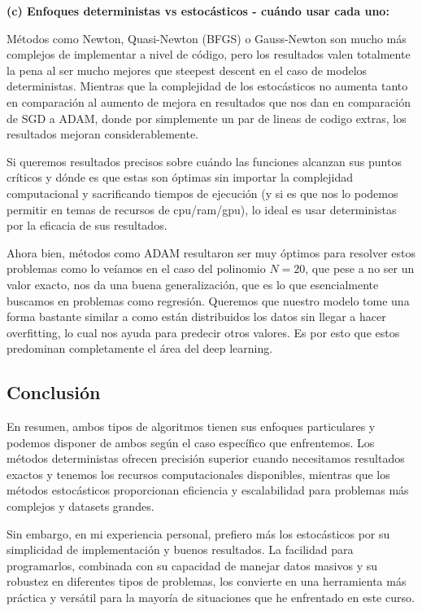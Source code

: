 \documentclass{article}
\begin{document}
\textbf{(c) Enfoques deterministas vs estocásticos - cuándo usar cada uno:}

Métodos como Newton, Quasi-Newton (BFGS) o Gauss-Newton son mucho más complejos de implementar a nivel de código, pero los resultados valen totalmente la pena al ser mucho mejores que steepest descent en el caso de modelos deterministas. Mientras que la complejidad de los estocásticos no aumenta tanto en comparación al aumento de mejora en resultados que nos dan en comparación de SGD a ADAM, donde por simplemente un par de lineas de codigo extras, los resultados mejoran considerablemente.

Si queremos resultados precisos sobre cuándo las funciones alcanzan sus puntos críticos y dónde es que estas son óptimas sin importar la complejidad computacional y sacrificando tiempos de ejecución (y si es que nos lo podemos permitir en temas de recursos de cpu/ram/gpu), lo ideal es usar deterministas por la eficacia de sus resultados.

Ahora bien, métodos como ADAM resultaron ser muy óptimos para resolver estos problemas como lo veíamos en el caso del polinomio $N=20$, que pese a no ser un valor exacto, nos da una buena generalización, que es lo que esencialmente buscamos en problemas como regresión. Queremos que nuestro modelo tome una forma bastante similar a como están distribuidos los datos sin llegar a hacer overfitting, lo cual nos ayuda para predecir otros valores. Es por esto que estos predominan completamente el área del deep learning.

\subsection{Conclusión}

En resumen, ambos tipos de algoritmos tienen sus enfoques particulares y podemos disponer de ambos según el caso específico que enfrentemos. Los métodos deterministas ofrecen precisión superior cuando necesitamos resultados exactos y tenemos los recursos computacionales disponibles, mientras que los métodos estocásticos proporcionan eficiencia y escalabilidad para problemas más complejos y datasets grandes.

Sin embargo, en mi experiencia personal, prefiero más los estocásticos por su simplicidad de implementación y buenos resultados. La facilidad para programarlos, combinada con su capacidad de manejar datos masivos y su robustez en diferentes tipos de problemas, los convierte en una herramienta más práctica y versátil para la mayoría de situaciones que he enfrentado en este curso.
\end{document}
